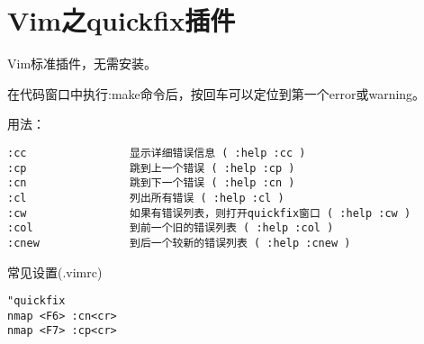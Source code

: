 \section{Vim之quickfix插件}
Vim标准插件，无需安装。

在代码窗口中执行:make命令后，按回车可以定位到第一个error或warning。

用法：
\begin{verbatim}
:cc                显示详细错误信息 ( :help :cc )
:cp                跳到上一个错误 ( :help :cp )
:cn                跳到下一个错误 ( :help :cn )
:cl                列出所有错误 ( :help :cl )
:cw                如果有错误列表，则打开quickfix窗口 ( :help :cw )
:col               到前一个旧的错误列表 ( :help :col )
:cnew              到后一个较新的错误列表 ( :help :cnew ) 
\end{verbatim}

常见设置(.vimrc)
\begin{verbatim}
"quickfix
nmap <F6> :cn<cr>
nmap <F7> :cp<cr>
\end{verbatim}


